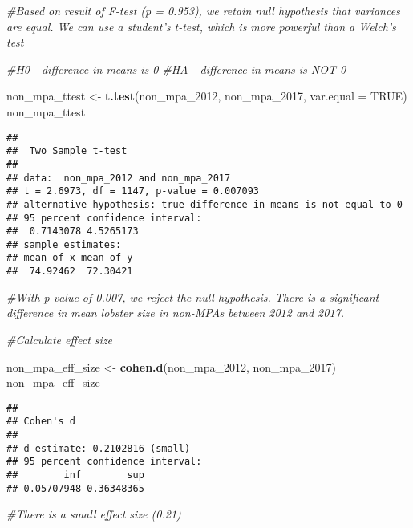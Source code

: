 \documentclass[]{article}
\newenvironment{Shaded}{\begin{snugshade}}{\end{snugshade}}
\newcommand{\KeywordTok}[1]{\textcolor[rgb]{0.13,0.29,0.53}{\textbf{#1}}}
\newcommand{\DataTypeTok}[1]{\textcolor[rgb]{0.13,0.29,0.53}{#1}}
\newcommand{\DecValTok}[1]{\textcolor[rgb]{0.00,0.00,0.81}{#1}}
\newcommand{\StringTok}[1]{\textcolor[rgb]{0.31,0.60,0.02}{#1}}
\newcommand{\CommentTok}[1]{\textcolor[rgb]{0.56,0.35,0.01}{\textit{#1}}}
\newcommand{\OtherTok}[1]{\textcolor[rgb]{0.56,0.35,0.01}{#1}}
\newcommand{\NormalTok}[1]{#1}
\begin{document}
\begin{Shaded}
\begin{Highlighting}[]
\CommentTok{#Based on result of F-test (p = 0.953), we retain null hypothesis that variances are equal. We can use a student's t-test, which is more powerful than a Welch's test}

\CommentTok{#H0 - difference in means is 0}
\CommentTok{#HA - difference in means is NOT 0}

\NormalTok{non_mpa_ttest <-}\StringTok{ }\KeywordTok{t.test}\NormalTok{(non_mpa_}\DecValTok{2012}\NormalTok{, non_mpa_}\DecValTok{2017}\NormalTok{, }\DataTypeTok{var.equal =} \OtherTok{TRUE}\NormalTok{)}
\NormalTok{non_mpa_ttest}
\end{Highlighting}
\end{Shaded}

\begin{verbatim}
## 
##  Two Sample t-test
## 
## data:  non_mpa_2012 and non_mpa_2017
## t = 2.6973, df = 1147, p-value = 0.007093
## alternative hypothesis: true difference in means is not equal to 0
## 95 percent confidence interval:
##  0.7143078 4.5265173
## sample estimates:
## mean of x mean of y 
##  74.92462  72.30421
\end{verbatim}

\begin{Shaded}
\begin{Highlighting}[]
\CommentTok{#With p-value of 0.007, we reject the null hypothesis. There is a significant difference in mean lobster size in non-MPAs between 2012 and 2017.}

\CommentTok{#Calculate effect size}

\NormalTok{non_mpa_eff_size <-}\StringTok{ }\KeywordTok{cohen.d}\NormalTok{(non_mpa_}\DecValTok{2012}\NormalTok{, non_mpa_}\DecValTok{2017}\NormalTok{)}
\NormalTok{non_mpa_eff_size}
\end{Highlighting}
\end{Shaded}

\begin{verbatim}
## 
## Cohen's d
## 
## d estimate: 0.2102816 (small)
## 95 percent confidence interval:
##        inf        sup 
## 0.05707948 0.36348365
\end{verbatim}

\begin{Shaded}
\begin{Highlighting}[]
\CommentTok{#There is a small effect size (0.21)}
\end{Highlighting}
\end{Shaded}
\end{document}
